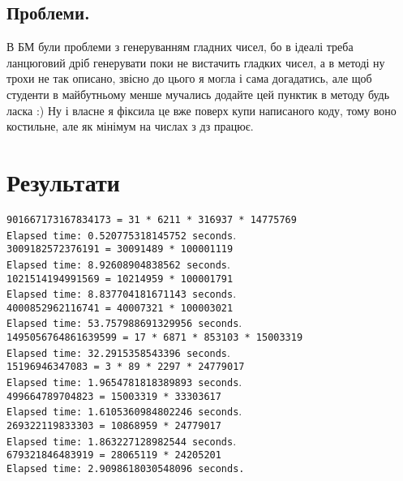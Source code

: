 \documentclass[a4paper,12pt]{article}
\begin{document}
\subsection{Проблеми.}
\tab В БМ були проблеми з генеруванням гладних чисел, бо в ідеалі треба ланцюговий дріб генерувати поки не вистачить гладких чисел, а в методі ну трохи не так описано, звісно до цього я могла і сама догадатись, але щоб студенти в майбутньому менше мучались додайте цей пунктик в методу будь ласка :)
 Ну і власне я фіксила це вже поверх купи написаного коду, тому воно костильне, але як мінімум на числах з дз працює. 
\section{Результати}

\tab\texttt{901667173167834173 = 31 * 6211 * 316937 * 14775769\\
Elapsed time: 0.520775318145752 seconds}.\\

\texttt{3009182572376191 = 30091489 * 100001119\\
Elapsed time: 8.92608904838562 seconds}.\\

\texttt{1021514194991569 = 10214959 * 100001791\\
Elapsed time: 8.837704181671143 seconds}.\\

\texttt{4000852962116741 = 40007321 * 100003021\\
Elapsed time: 53.757988691329956 seconds}.\\

\texttt{1495056764861639599 = 17 * 6871 * 853103 * 15003319\\
Elapsed time: 32.2915358543396 seconds}.\\

\texttt{15196946347083 = 3 * 89 * 2297 * 24779017\\
Elapsed time: 1.9654781818389893 seconds}.\\

\texttt{499664789704823 = 15003319 * 33303617\\
Elapsed time: 1.6105360984802246 seconds}.\\

\texttt{269322119833303 = 10868959 * 24779017\\
Elapsed time: 1.863227128982544 seconds}.\\

\texttt{679321846483919 = 28065119 * 24205201\\
Elapsed time: 2.9098618030548096 seconds.}\\
\end{document}
